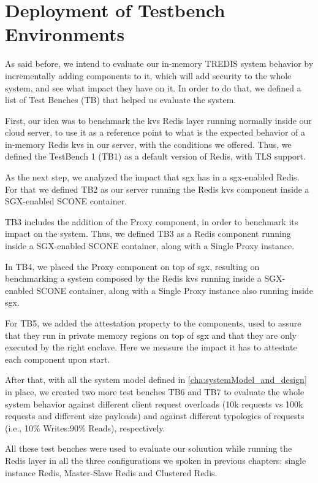 \section{Deployment of Testbench Environments}
\label{sec:testBenchEnvironments}

As said before, we intend to evaluate our in-memory TREDIS system behavior by incrementally adding components to it, which will add security to the whole system, and see what impact they have on it. In order to do that, we defined a list of Test Benches (TB) that helped us evaluate the system.

First, our idea was to benchmark the \gls{kvs} Redis layer running normally inside our cloud server, to use it as a reference point to what is the expected behavior of a in-memory Redis \gls{kvs} in our server, with the conditions we offered. Thus, we defined the TestBench 1 (TB1) as a default version of Redis, with TLS support.

As the next step, we analyzed the impact that \gls{sgx} has in a \gls{sgx}-enabled Redis. For that we defined TB2 as our server running the Redis \gls{kvs} component inside a SGX-enabled SCONE container.

TB3 includes the addition of the Proxy component, in order to benchmark its impact on the system. Thus, we defined TB3 as a Redis component running inside a SGX-enabled SCONE container, along with a Single Proxy instance.

In TB4, we placed the Proxy component on top of \gls{sgx}, resulting on benchmarking a system composed by the Redis \gls{kvs} running inside a SGX-enabled SCONE container, along with a Single Proxy instance also running inside \gls{sgx}.

For TB5, we added the attestation property to the components, used to assure that they run in private memory regions on top of \gls{sgx} and that they are only executed by the right enclave. Here we measure the impact it has to attestate each component upon start.

After that, with all the system model defined in \ref{cha:systemModel_and_design} in place, we created two more test benches TB6 and TB7 to evaluate the whole system behavior against different client request overloads (10k requests vs 100k requests and different size payloads) and against different typologies of requests (i.e., 10\% Writes:90\% Reads), respectively.

All these test benches were used to evaluate our soluution while running the Redis layer in all the three configurations we spoken in previous chapters: single instance Redis, Master-Slave Redis and Clustered Redis.



